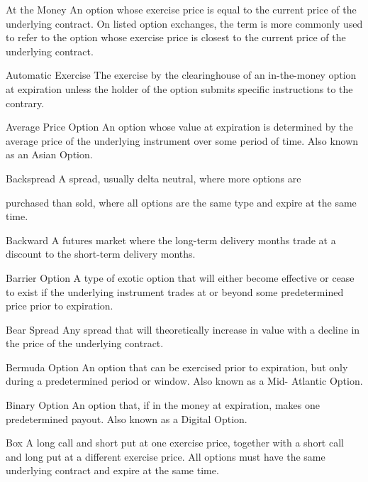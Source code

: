At the Money An option whose exercise price is equal to the current price of the underlying contract. On listed option exchanges, the term is more commonly used to refer to the option whose exercise price is closest to the current price of the underlying contract.\par
Automatic Exercise The exercise by the clearinghouse of an in-the-money option at expiration unless the holder of the option submits specific instructions to the contrary.\par
Average Price Option An option whose value at expiration is determined by the average price of the underlying instrument over some period of time. Also known as an Asian Option.\par
Backspread A spread, usually  delta  neutral, where more options are\par
purchased than sold, where all options are the same type and expire at the same time.\par
Backward A futures market where the long-term delivery months trade at a discount to the short-term delivery months.\par
Barrier Option A type of exotic option that will either become effective or cease to exist if the underlying instrument trades at or beyond some predetermined price prior to expiration.\par
Bear Spread Any spread that will theoretically increase in value with a decline in the price of the underlying contract.\par
Bermuda Option An option that can be exercised prior to expiration, but only during a predetermined period or window. Also known as a Mid- Atlantic Option.\par
Binary Option An option that, if in the money at expiration, makes one predetermined payout. Also known as a Digital Option.\par
Box A long call and short put at one exercise price, together with a short call and long put at a different exercise price. All options must have the same underlying contract and expire at the same time.\par

